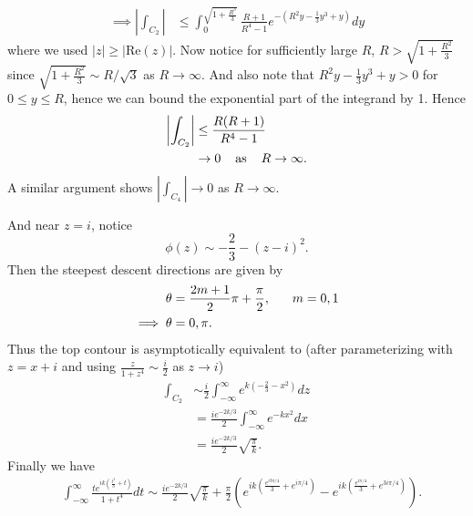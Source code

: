 \documentclass{article}
\begin{document}
\begin{itemize}
\begin{itemize}
\begin{align*}
            \implies \left|\int_{C_2}\right| &\leq \int_0^{\sqrt{1 + \frac{R^3}{3}}}\frac{R + 1}{R^4 - 1}e^{-\left(R^2y - \tfrac{1}{3}y^3 + y\right)}dy
        \end{align*}
        where we used $|z| \geq |\text{Re}(z)|$. Now notice for sufficiently large $R$, $R > \sqrt{1 + \frac{R^2}{3}}$ since $\sqrt{1 + \frac{R^2}{3}} \sim R/\sqrt{3}$ as $R \to \infty$. And also note that $R^2y - \frac{1}{3}y^3 + y > 0$ for $0 \leq y \leq R$, hence we can bound the exponential part of the integrand by 1. Hence
        \begin{align*}
            \left|\int_{C_2}\right| &\leq \frac{R(R + 1)}{R^4  - 1}\\
            &\to 0 \hspace{0.4cm} \text{as} \hspace{0.4cm} R \to \infty.
        \end{align*}
        A similar argument shows ${\displaystyle \left|\int_{C_4}\right| \to 0 }$ as $R \to \infty$.
        

        
        
        
        And near $z = i$, notice
        \[\phi(z) \sim -\frac{2}{3} - (z - i)^2.\]
        Then the steepest descent directions are given by 
        \begin{align*}
            \theta &= \frac{2m + 1}{2}\pi + \frac{\pi}{2}, \hspace{0.6cm} m = 0,1\\
            \implies \theta &= 0,\pi.
        \end{align*}
        Thus the top contour is asymptotically equivalent to (after parameterizing with $z = x + i$ and using $\frac{z}{1 + z^4}\sim \frac{i}{2}$ as $z \to i$)
        \begin{align*}
            \int_{C_2} &\sim \frac{i}{2}\int_{-\infty}^{\infty}e^{k\left(-\tfrac{2}{3} - x^2\right)}dz\\
            &= \frac{ie^{-2k/3}}{2}\int_{-\infty}^{\infty}e^{-kx^2}dx\\
            &= \frac{ie^{-2k/3}}{2}\sqrt{\frac{\pi}{k}}.
        \end{align*}
        Finally we have
        \begin{align*}
            &\int_{-\infty}^{\infty} \frac{te^{ik\left(\tfrac{t^3}{3} + t\right)}}{1 + t^4}dt \sim \frac{ie^{-2k/3}}{2}\sqrt{\frac{\pi}{k}} + \frac{\pi}{2}\left(e^{ik\left(\tfrac{e^{i3\pi/4}}{3} + e^{i\pi/4}\right)} - e^{ik\left(\tfrac{e^{i\pi/4}}{3} + e^{3i\pi/4}\right)}\right).
        \end{align*}
        

\end{itemize}
\end{itemize}
\end{document}
